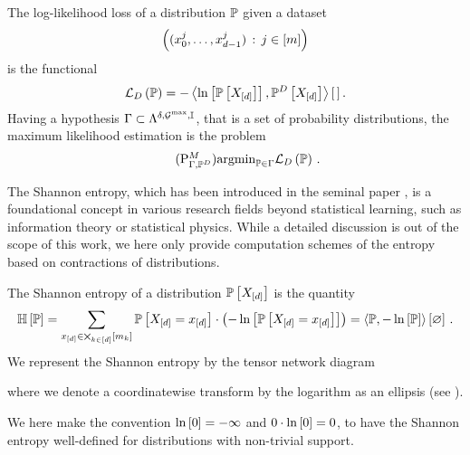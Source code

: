 \begin{definition}
    \label{def:loss}
    The log-likelihood loss of a distribution $\mathbb{P}$ given a dataset
    \begin{align*}
        \left(({x_{0}^{j},\ldots,x_{d-1}^{j}})\,:\,j\in[m]\right)
    \end{align*}
    is the functional
    \begin{align*}
        \mathcal{L}_{D}\left(\mathbb{P}\right)
        = -\left\langle \ln \left[ \mathbb{P}\left[X_{[d]}\right] \right],\mathbb{P}^{D}\left[X_{[d]}\right]\right\rangle \left[ \, \right] .
    \end{align*}
    Having a hypothesis $\Gamma\subset\Lambda^{\delta,\mathcal{G}^{\mathrm{max}},\mathbb{I}}$, that is a set of probability distributions, the maximum likelihood estimation is the problem
    \begin{align}
        \label{prob:parameterMaxLikelihood}\tag{$\probtagtypeinst{M}{\Gamma,\empdistribution}$}
        \argmin_{\probtensorin} \lossof{\probtensor} \, .
    \end{align}
\end{definition}



The Shannon entropy, which has been introduced in the seminal paper \cite{shannon_mathematical_1948}, is a foundational concept in various research fields beyond statistical learning, such as information theory or statistical physics.
While a detailed discussion is out of the scope of this work, we here only provide computation schemes of the entropy based on contractions of distributions.

\begin{definition}
    The Shannon entropy of a distribution $\mathbb{P}\left[X_{[d]}\right]$ is the quantity
    \begin{align*}
        \mathbb{H}\left[\mathbb{P}\right]
        =  \sum_{x_{[d]}\in\bigtimes_{k\in[d]}[m_{k}]} \mathbb{P}\left[X_{[d]}=x_{[d]}\right] \cdot \left(-\ln \left[ \mathbb{P}\left[X_{[d]}=x_{[d]}\right] \right]\right)
        = \left\langle \mathbb{P},-\ln \left[ \mathbb{P} \right]\right\rangle \left[ \varnothing \right] \, .
    \end{align*}
    We represent the Shannon entropy by the tensor network diagram
    \begin{center}
        
    \end{center}
    where we denote a coordinatewise transform by the logarithm as an ellipsis (see ).
\end{definition}

We here make the convention $\ln \left[ 0 \right]=-\infty$ and $0\cdot\ln \left[ 0 \right] = 0$, to have the Shannon entropy well-defined for distributions with non-trivial support.

